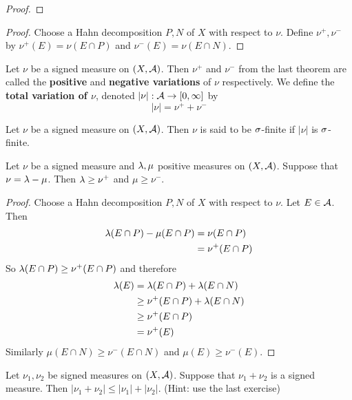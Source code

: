 \documentclass{book}
\begin{document}
	\begin{proof}
		 
	\end{proof}
	
	\begin{proof}
		Choose a Hahn decomposition $P,N$ of $X$ with respect to $\nu$. Define $\nu^+, \nu^-$ by $\nu^+(E)= \nu(E \cap P)$ and $\nu^-(E) = \nu(E \cap N)$.
	\end{proof}
	
	\begin{defn}  
		Let $\nu$ be a signed measure on $(X, \mathcal{A})$. Then $\nu^+$ and $\nu^-$ from the last theorem are called the \textbf{positive} and \textbf{negative variations} of $\nu$ respectively. We define the \textbf{total variation of $\nu$}, denoted $|\nu|:\mathcal{A} \rightarrow [0, \infty]$ by $$|\nu| = \nu^+ + \nu^-$$ 
	\end{defn}
	
	\begin{defn}  
		Let $\nu$ be a signed measure on $(X,\mathcal{A})$. Then $\nu$ is said to be $\sigma$-finite if $|\nu|$ is $\sigma$-finite.
	\end{defn}
	
	\begin{ex}  
		Let $\nu$ be a signed measure and $\lambda, \mu$ positive measures on $(X,\mathcal{A})$. Suppose that $\nu = \lambda - \mu$. Then $\lambda \geq \nu^+$ and $\mu \geq \nu^-$.
	\end{ex}
	
	\begin{proof}
		Choose a Hahn decomposition $P,N$ of $X$ with respect to $\nu$. Let $E \in \mathcal{A}$. Then 
		\begin{align*}
			\lambda(E \cap P) - \mu(E \cap P) 
			&= \nu(E \cap P)\\
			&= \nu^+(E \cap P)
		\end{align*}
		So $\lambda(E \cap P) \geq  \nu^+(E \cap P) $ and therefore 
		\begin{align*}
			\lambda(E) 
			&= \lambda(E \cap P) + \lambda(E \cap N)\\
			& \geq \nu^+(E \cap P) + \lambda (E \cap N)\\
			& \geq \nu^+(E \cap P)\\
			& = \nu^+(E)
		\end{align*} 
		Similarly $\mu(E \cap N) \geq \nu^-(E \cap N)$ and $\mu(E) \geq \nu^-(E)$.
	\end{proof}
	
	\begin{ex}  
		Let $\nu_1, \nu_2$ be signed measures on $(X, \mathcal{A})$. Suppose that $\nu_1 + \nu_2$ is a signed measure. Then $|\nu_1 + \nu_2| \leq |\nu_1|+ |\nu_2|$. (Hint: use the last exercise)
	\end{ex}
	
\end{document}

